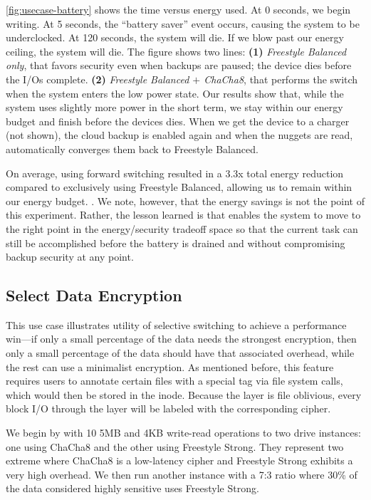 \cref{fig:usecase-battery} shows the time versus energy used. At 0 seconds, we
begin writing. At 5 seconds, the ``battery saver'' event occurs, causing the
system to be underclocked. At 120 seconds, the system will die. If we blow past
our energy ceiling, the system will die. The figure shows two lines:
%
{\bf (1)} {\em Freestyle Balanced only}, that favors security even when backups
are paused; the device dies before the I/Os complete.
%
{\bf (2)} {\em Freestyle Balanced $+$ ChaCha8}, that performs the switch when
the system enters the low power state. Our results show that, while the system
uses slightly more power in the short term, we stay within our energy budget and
finish before the devices dies.
%
When we get the device to a charger (not shown), the cloud backup is enabled
again and when the nuggets are read, \sys automatically converges them back to
Freestyle Balanced.

On average, using forward switching resulted in a 3.3x total energy reduction
compared to exclusively using Freestyle Balanced, allowing us to remain within
our energy budget. . We note, however, that the energy savings is not
the point of this experiment. Rather, the lesson learned is that \sys enables
the system to move to the right point in the energy/security tradeoff space so
that the current task can still be accomplished before the battery is drained
and without compromising backup security at any point.


\subsection{Select Data Encryption}\label{subsec:usecase-agnostic}

This use case illustrates utility of selective switching to achieve a
performance win---if only a small percentage of the data needs the strongest
encryption, then only a small percentage of the data should have that associated
overhead, while the rest can use a minimalist encryption. As mentioned before,
this feature requires users to annotate certain files with a special tag via
file system calls, which would then be stored in the inode. Because the \sys
layer is file oblivious, every block I/O through the \sys layer will be labeled
with the corresponding cipher.

We begin by with 10 5MB and 4KB write-read operations to two \sys drive
instances: one using ChaCha8 and the other using Freestyle Strong. They
represent two extreme where ChaCha8 is a low-latency cipher and Freestyle Strong
exhibits a very high overhead. We then run another \sys instance with a 7:3
ratio where 30\% of the data considered highly sensitive uses Freestyle Strong.

